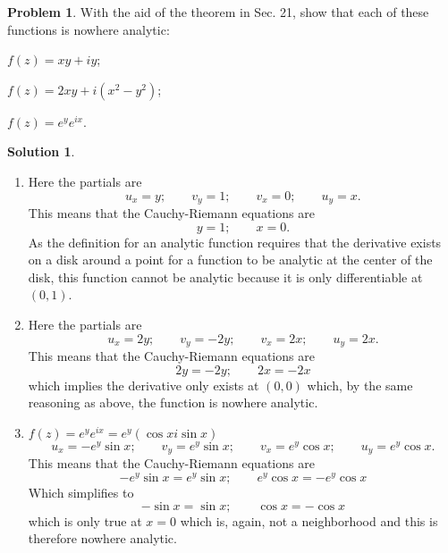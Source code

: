 \documentclass[10pt]{article}
\theoremstyle{definition}
\newtheorem{problem}{Problem}
\newtheorem{soln}{Solution}
\begin{document}
\begin{problem}
With the aid of the theorem in Sec. 21, show that each of these functions is nowhere
analytic:
\begin{center}
  \begin{enumerate*}[label=(\alph*)]
    \item $f(z)=xy+iy$;\qquad~
    \item $f(z)=2xy+i(x^2-y^2)$;\qquad~
    \item $f(z)=e^ye^{ix}$.
  \end{enumerate*}
\end{center}
\end{problem}
\begin{soln}~
  \begin{enumerate}[label=(\alph*)]
    \item Here the partials are
          $$u_x=y;\qquad v_y=1;\qquad v_x=0;\qquad u_y=x.$$
          This means that the Cauchy-Riemann equations are
          $$y=1;\qquad x=0.$$
          As the definition for an analytic function requires that the derivative exists on a disk around a point for
          a function to be analytic at the center of the disk, this function cannot be analytic because it is only
          differentiable at $(0,1)$.
    \item Here the partials are
          $$u_x=2y;\qquad v_y=-2y;\qquad v_x=2x;\qquad u_y=2x.$$
          This means that the Cauchy-Riemann equations are
          $$2y=-2y;\qquad 2x=-2x$$
          which implies the derivative only exists at $(0,0)$
          which, by the same reasoning as above, the function is nowhere analytic.
    \item $f(z)=e^ye^{ix}=e^y\left(\cos x i\sin x\right)$
          $$u_x=-e^y\sin x;\qquad v_y=e^y\sin x;\qquad v_x=e^y\cos x;\qquad u_y=e^y\cos x.$$
          This means that the Cauchy-Riemann equations are
          $$-e^y\sin x=e^y\sin x;\qquad e^y\cos x=-e^y\cos x$$
          Which simplifies to
          $$-\sin x=\sin x;\qquad \cos x=-\cos x$$
          which is only true at $x=0$ which is, again, not a neighborhood and this is therefore nowhere analytic.
  \end{enumerate}
\end{soln}
\end{document}
